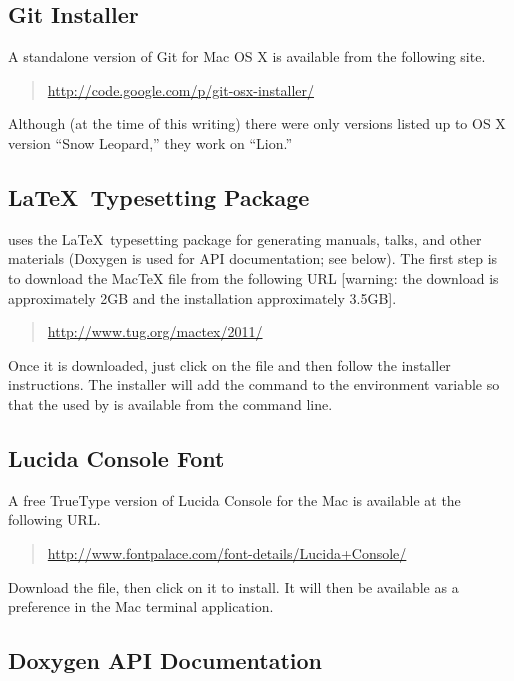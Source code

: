 \subsection{Git Installer}

A standalone version of Git for Mac OS X is available from the
following site. 
%
\begin{quote}
\url{http://code.google.com/p/git-osx-installer/}
\end{quote}
%
Although (at the time of this writing) there were only versions listed
up to OS X version ``Snow Leopard,'' they work on ``Lion.''

\subsection{\LaTeX\ Typesetting Package}

\Stan uses the \LaTeX\ typesetting package for generating manuals,
talks, and other materials (Doxygen is used for API documentation; see
below).  The first step is to download the MacTeX  file
from the following URL [warning: the download is approximately 2GB and
the installation approximately 3.5GB].
%
\begin{quote}
\url{http://www.tug.org/mactex/2011/}
\end{quote}
%
Once it is downloaded, just click on the  file and then
follow the installer instructions.  The installer will add the command
to the  environment variable so that the 
used by \Stan is available from the command line.


\subsection{Lucida Console Font}

A free TrueType version of Lucida Console for the Mac is available
at the following URL.
%
\begin{quote}
\url{http://www.fontpalace.com/font-details/Lucida+Console/}
\end{quote}
%
Download the  file, then click on it to install.  It
will then be available as a preference in the Mac terminal application.

\subsection{Doxygen API Documentation}

